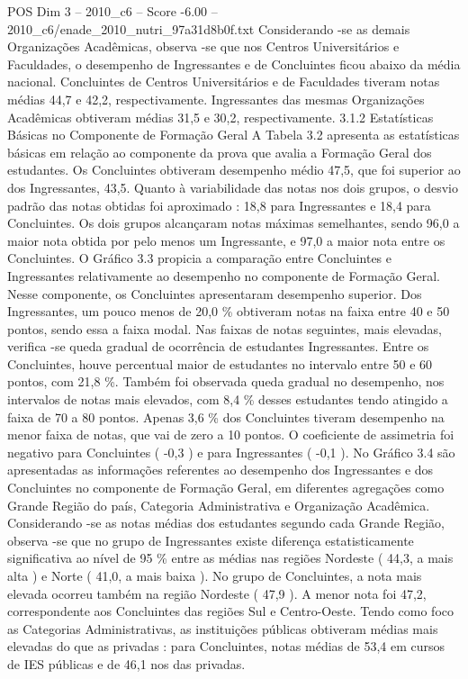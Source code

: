 \begin{textsample}{POS Dim 3 – 2010\_c6 – Score -6.00 – 2010\_c6/enade\_2010\_nutri\_97a31d8b0f.txt}
Considerando -se as demais Organizações Acadêmicas, observa -se que nos Centros Universitários e Faculdades, o desempenho de Ingressantes e de Concluintes ficou abaixo da média nacional.
Concluintes de Centros Universitários e de Faculdades tiveram notas médias 44,7 e 42,2, respectivamente.
Ingressantes das mesmas Organizações Acadêmicas obtiveram médias 31,5 e 30,2, respectivamente. 3.1.2 Estatísticas Básicas no Componente de Formação Geral A Tabela 3.2 apresenta as estatísticas básicas em relação ao componente da prova que avalia a Formação Geral dos estudantes.
Os Concluintes obtiveram desempenho médio 47,5, que foi superior ao dos Ingressantes, 43,5.
Quanto à variabilidade das notas nos dois grupos, o desvio padrão das notas obtidas foi aproximado : 18,8 para Ingressantes e 18,4 para Concluintes.
Os dois grupos alcançaram notas máximas semelhantes, sendo 96,0 a maior nota obtida por pelo menos um Ingressante, e 97,0 a maior nota entre os Concluintes.
O Gráfico 3.3 propicia a comparação entre Concluintes e Ingressantes relativamente ao desempenho no componente de Formação Geral.
Nesse componente, os Concluintes apresentaram desempenho superior.
Dos Ingressantes, um pouco menos de 20,0 \% obtiveram notas na faixa entre 40 e 50 pontos, sendo essa a faixa modal.
Nas faixas de notas seguintes, mais elevadas, verifica -se queda gradual de ocorrência de estudantes Ingressantes.
Entre os Concluintes, houve percentual maior de estudantes no intervalo entre 50 e 60 pontos, com 21,8 \%.
Também foi observada queda gradual no desempenho, nos intervalos de notas mais elevados, com 8,4 \% desses estudantes tendo atingido a faixa de 70 a 80 pontos.
Apenas 3,6 \% dos Concluintes tiveram desempenho na menor faixa de notas, que vai de zero a 10 pontos.
O coeficiente de assimetria foi negativo para Concluintes ( -0,3 ) e para Ingressantes ( -0,1 ).
No Gráfico 3.4 são apresentadas as informações referentes ao desempenho dos Ingressantes e dos Concluintes no componente de Formação Geral, em diferentes agregações como Grande Região do país, Categoria Administrativa e Organização Acadêmica.
Considerando -se as notas médias dos estudantes segundo cada Grande Região, observa -se que no grupo de Ingressantes existe diferença estatisticamente significativa ao nível de 95 \% entre as médias nas regiões Nordeste ( 44,3, a mais alta ) e Norte ( 41,0, a mais baixa ).
No grupo de Concluintes, a nota mais elevada ocorreu também na região Nordeste ( 47,9 ).
A menor nota foi 47,2, correspondente aos Concluintes das regiões Sul e Centro-Oeste.
Tendo como foco as Categorias Administrativas, as instituições públicas obtiveram médias mais elevadas do que as privadas : para Concluintes, notas médias de 53,4 em cursos de IES públicas e de 46,1 nos das privadas.

\end{textsample}
